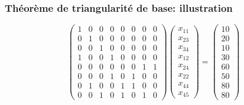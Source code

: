 \documentclass[usepdftitle=false]{beamer}
\begin{document}
\begin{frame}
\frametitle{Théorème de triangularité de base: illustration}

\[
\begin{pmatrix}
 1 & 0 & 0 & 0 & 0 & 0 & 0 & 0 \\
 0 & 1 & 0 & 0 & 0 & 0 & 0 & 0 \\
 0 & 0 & 1 & 0 & 0 & 0 & 0 & 0 \\
 1 & 0 & 0 & 1 & 0 & 0 & 0 & 0 \\
 0 & 0 & 0 & 0 & 0 & 0 & 1 & 1 \\
 0 & 0 & 0 & 1 & 0 & 1 & 0 & 0 \\
 0 & 1 & 0 & 0 & 1 & 1 & 0 & 0 \\
 0 & 0 & 1 & 0 & 1 & 0 & 1 & 0
\end{pmatrix}
\begin{pmatrix}
x_{11} \\
x_{23} \\
x_{34} \\
x_{12} \\
x_{24} \\
x_{22} \\
x_{44} \\
x_{45}
\end{pmatrix}
=
\begin{pmatrix}
10 \\
20 \\
10 \\
30 \\
60 \\
50 \\
80 \\
80
\end{pmatrix}
\]

\end{frame}
\end{document}
